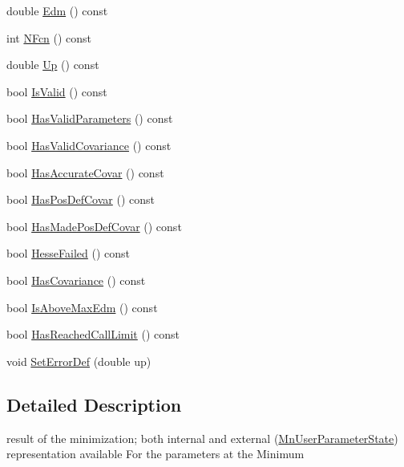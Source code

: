 \begin{DoxyCompactItemize}
\item 
double \mbox{\hyperlink{classROOT_1_1Minuit2_1_1BasicFunctionMinimum_abecb5c249e988f6f3f792e2bcc11d4a4}{Edm}} () const
\item 
int \mbox{\hyperlink{classROOT_1_1Minuit2_1_1BasicFunctionMinimum_a1b73ebb29cc319f09fdd5a4408e703ba}{N\+Fcn}} () const
\item 
double \mbox{\hyperlink{classROOT_1_1Minuit2_1_1BasicFunctionMinimum_a576364a872f31ede72df956b103e0d6e}{Up}} () const
\item 
bool \mbox{\hyperlink{classROOT_1_1Minuit2_1_1BasicFunctionMinimum_a644f34dabb94b0b5bdc8f7b8bfa7ae4b}{Is\+Valid}} () const
\item 
bool \mbox{\hyperlink{classROOT_1_1Minuit2_1_1BasicFunctionMinimum_a91fedd04974dd5d27981eb758405670f}{Has\+Valid\+Parameters}} () const
\item 
bool \mbox{\hyperlink{classROOT_1_1Minuit2_1_1BasicFunctionMinimum_a2bf14deac281ae646e88a2fa6d0b5012}{Has\+Valid\+Covariance}} () const
\item 
bool \mbox{\hyperlink{classROOT_1_1Minuit2_1_1BasicFunctionMinimum_acc1e5d50ec4abe632af93c5dcebd9c0e}{Has\+Accurate\+Covar}} () const
\item 
bool \mbox{\hyperlink{classROOT_1_1Minuit2_1_1BasicFunctionMinimum_a82e819b720ca93301fdea10fc10af791}{Has\+Pos\+Def\+Covar}} () const
\item 
bool \mbox{\hyperlink{classROOT_1_1Minuit2_1_1BasicFunctionMinimum_a57562fcd9f78a8e4f9a425c8f80f1d83}{Has\+Made\+Pos\+Def\+Covar}} () const
\item 
bool \mbox{\hyperlink{classROOT_1_1Minuit2_1_1BasicFunctionMinimum_a8bcb47393d7e39ec1c8fda42974d092f}{Hesse\+Failed}} () const
\item 
bool \mbox{\hyperlink{classROOT_1_1Minuit2_1_1BasicFunctionMinimum_ac876224368add09ceab711d3515fd959}{Has\+Covariance}} () const
\item 
bool \mbox{\hyperlink{classROOT_1_1Minuit2_1_1BasicFunctionMinimum_a6c37206680e19443048e8b398ef5ced8}{Is\+Above\+Max\+Edm}} () const
\item 
bool \mbox{\hyperlink{classROOT_1_1Minuit2_1_1BasicFunctionMinimum_ab26a12c388b15f056c9effa0abcd7639}{Has\+Reached\+Call\+Limit}} () const
\item 
void \mbox{\hyperlink{classROOT_1_1Minuit2_1_1BasicFunctionMinimum_ae89163fbfaccda743a6ca8d3add896dc}{Set\+Error\+Def}} (double up)
\end{DoxyCompactItemize}


\subsection{Detailed Description}
result of the minimization; both internal and external (\mbox{\hyperlink{classROOT_1_1Minuit2_1_1MnUserParameterState}{Mn\+User\+Parameter\+State}}) representation available For the parameters at the Minimum 


